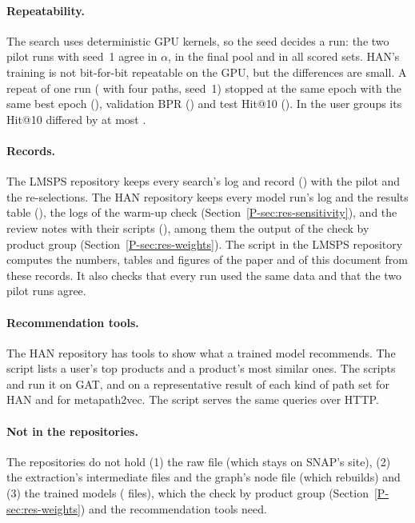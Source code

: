 \paragraph{Repeatability.} The search uses deterministic GPU kernels, so the seed decides a run: the
two pilot runs with seed~1 agree in $\alpha$, in the final pool and in all  scored
sets. HAN's training is not bit-for-bit repeatable on the GPU, but the differences are small. A
repeat of one run ( with four paths, seed~1) stopped at the same epoch with the same best
epoch (), validation BPR () and test Hit@10
(). In the user groups its Hit@10 differed by at most
.

\paragraph{Records.} The LMSPS repository keeps every search's log and record
() with the pilot and the re-selections. The HAN repository keeps every
model run's log and the results table (), the logs of the warm-up check
(Section~\ref*{P-sec:res-sensitivity}), and the review notes with their scripts (),
among them the output of the check by product group (Section~\ref*{P-sec:res-weights}). The script
 in the LMSPS repository computes the numbers, tables and figures of
the paper and of this document from these records. It also checks that every run used the same data and that the two
pilot runs agree.

\paragraph{Recommendation tools.} The HAN repository has tools to show what a trained model
recommends. The script  lists a user's top products and a product's most
similar ones. The scripts  and  run it on GAT,
and on a representative result of each kind of path set for HAN and for metapath2vec. The script
 serves the same queries over HTTP.

\paragraph{Not in the repositories.} The repositories do not hold (1) the raw file (which stays
on SNAP's site), (2) the extraction's intermediate files and the graph's node file (which
 rebuilds) and (3) the trained models ( files), which the check by
product group (Section~\ref*{P-sec:res-weights}) and the recommendation tools need.

